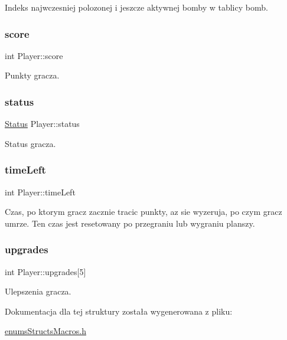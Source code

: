 Indeks najwczesniej polozonej i jeszcze aktywnej bomby w tablicy bomb. \mbox{\label{struct_player_ace6abae8d66534ad0a1fd6458f786a6e}} 
\subsubsection{\texorpdfstring{score}{score}}
{\footnotesize\ttfamily int Player\+::score}

Punkty gracza. \mbox{\label{struct_player_aeb08943a32834515e66222d2e948292d}} 
\subsubsection{\texorpdfstring{status}{status}}
{\footnotesize\ttfamily \mbox{\hyperlink{enums_structs_macros_8h_a67a0db04d321a74b7e7fcfd3f1a3f70b}{Status}} Player\+::status}

Status gracza. \mbox{\label{struct_player_a9f5df822bb76dbd172b957db9bb33458}} 
\subsubsection{\texorpdfstring{time\+Left}{timeLeft}}
{\footnotesize\ttfamily int Player\+::time\+Left}

Czas, po ktorym gracz zacznie tracic punkty, az sie wyzeruja, po czym gracz umrze. Ten czas jest resetowany po przegraniu lub wygraniu planszy. \mbox{\label{struct_player_ac7640ac0f1e50faad29e878fc91fc844}} 
\subsubsection{\texorpdfstring{upgrades}{upgrades}}
{\footnotesize\ttfamily int Player\+::upgrades\mbox{[}5\mbox{]}}

Ulepszenia gracza. 

Dokumentacja dla tej struktury została wygenerowana z pliku\+:\begin{DoxyCompactItemize}
\item 
\mbox{\hyperlink{enums_structs_macros_8h}{enums\+Structs\+Macros.\+h}}\end{DoxyCompactItemize}
